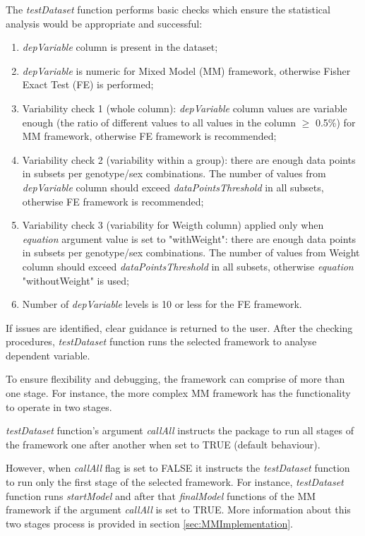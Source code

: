 \documentclass[12pt,a4paper]{article}
\begin{document}
The \textit{testDataset} function performs basic checks which ensure the statistical analysis would be appropriate and successful:
\begin{enumerate}
\item \textit{depVariable} column is present in the dataset;
\item \textit{depVariable} is numeric for Mixed Model (MM) framework, otherwise Fisher Exact Test (FE) is performed;
\item Variability check 1 (whole column): \textit{depVariable} column values are variable enough (the ratio of different values to all values in the column $\geq$ 0.5\%) for MM framework, otherwise  FE framework is recommended;
\item Variability check 2 (variability within a group): there are enough data points in subsets per genotype/sex combinations. The number of values from \textit{depVariable} column should exceed \textit{dataPointsThreshold} in all subsets, otherwise FE framework is recommended;
\item Variability check 3 (variability for Weigth column) applied only when \textit{equation} argument value is set to "withWeight": there are enough data points in subsets per genotype/sex combinations. The number of values from Weight column should exceed \textit{dataPointsThreshold} in all subsets, otherwise \textit{equation} "withoutWeight" is used;
\item Number of \textit{depVariable} levels is 10 or less for the FE framework.
\end{enumerate}

If issues are identified, clear guidance is returned to the user. 
After the checking procedures, \textit{testDataset} function runs the selected framework to analyse dependent variable. 

To ensure flexibility and debugging, the framework can comprise of more than one stage. For instance, the more complex MM framework has the functionality to operate in two stages.

\textit{testDataset} function's argument \textit{callAll} instructs the package to run all stages of the framework one after another when set to TRUE (default behaviour). 

However, when \textit{callAll} flag is set to FALSE it instructs the \textit{testDataset} function to run only the first stage of the selected framework.
For instance, \textit{testDataset} function runs \textit{startModel} and after that \textit{finalModel} functions of the MM framework if the argument \textit{callAll} is set to TRUE.  More information about this two stages process is provided in section \ref{sec:MMImplementation}.
\end{document}
